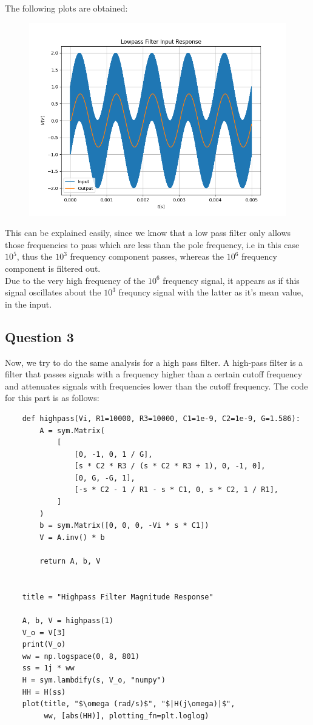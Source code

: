 \documentclass[12pt, a4paper]{article}
\begin{document}
The following plots are obtained:
\begin{figure}[H]
    \centering
    \includegraphics[scale=0.6]{2.png}
\end{figure}

This can be explained easily, since we know that a low pass filter only allows those frequencies to pass which are less than the pole frequency, i.e in this case $10^5$, thus the $10^3$ frequency component passes, whereas the $10^6$ frequency component is filtered out. \\Due to the very high frequency of the $10^6$ frequency signal, it appears as if this signal oscillates about the $10^3$ frequncy signal with the latter as it's mean value, in the input.

\subsection{Question 3}
Now, we try to do the same analysis for a high pass filter. A high-pass filter is a filter that passes signals with a frequency higher than a certain cutoff frequency and attenuates signals with frequencies lower than the cutoff frequency.
The code for this part is as follows:
\begin{lstlisting}
    def highpass(Vi, R1=10000, R3=10000, C1=1e-9, C2=1e-9, G=1.586):
        A = sym.Matrix(
            [
                [0, -1, 0, 1 / G],
                [s * C2 * R3 / (s * C2 * R3 + 1), 0, -1, 0],
                [0, G, -G, 1],
                [-s * C2 - 1 / R1 - s * C1, 0, s * C2, 1 / R1],
            ]
        )
        b = sym.Matrix([0, 0, 0, -Vi * s * C1])
        V = A.inv() * b

        return A, b, V


    title = "Highpass Filter Magnitude Response"

    A, b, V = highpass(1)
    V_o = V[3]
    print(V_o)
    ww = np.logspace(0, 8, 801)
    ss = 1j * ww
    H = sym.lambdify(s, V_o, "numpy")
    HH = H(ss)
    plot(title, "$\omega (rad/s)$", "$|H(j\omega)|$",
         ww, [abs(HH)], plotting_fn=plt.loglog)   
\end{lstlisting}
\end{document}
